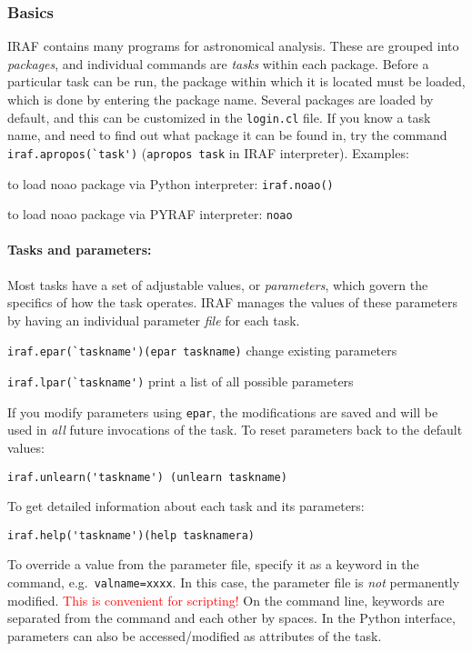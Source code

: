 \documentclass{article}
\begin{document}
\subsubsection*{Basics}
IRAF contains many programs for astronomical analysis. These are
grouped into \emph{packages}, and individual commands are
\emph{tasks} within each package.
Before a particular task can be run, the package within which
it is located must be loaded, which is done by entering the package
name. Several packages are loaded by default, and this can be
customized in the \verb|login.cl| file. If you know a task name, and need to
find out what package it can be found in, try the command
\verb|iraf.apropos(`task')|
(\verb|apropos task| in IRAF interpreter). Examples:
\begin{itemize*}
    \item to load noao package via Python interpreter:
        \verb|iraf.noao()|
    \item to load noao package via PYRAF interpreter:
        \verb|noao|
\end{itemize*}

\paragraph{Tasks and parameters:}
Most tasks have a set of adjustable values, or \emph{parameters}, which
govern the specifics of how the task operates.
IRAF manages the values of these parameters by having an
individual parameter \emph{file} for each task.
\begin{list}{}
    \item \verb|iraf.epar(`taskname')(epar taskname)|
        change existing parameters
    \item \verb|iraf.lpar(`taskname')|
        print a list of all possible parameters
\end{list}
If you modify parameters using
\verb|epar|, the modifications are saved and will be used in \emph{all}
future invocations of the task.
To reset parameters back to the default values:
\begin{list}{}
\item \verb|iraf.unlearn('taskname') (unlearn taskname)|
\end{list}
To get detailed information about each task and its parameters:
{\renewcommand{\labelitemi}{}
\begin{itemize*}
    \item \verb|iraf.help('taskname')(help tasknamera)|
\end{itemize*}}
To override a value from the parameter file, specify it as a
keyword in the command, e.g.\ \verb|valname=xxxx|. In this case, the
parameter file is \emph{not} permanently modified.
\textcolor{red}{This is convenient for scripting!}
On the command line, keywords are separated from the
command and each other by spaces.
In the Python interface, parameters can also be accessed/modified as
attributes of the task.
\end{document}
